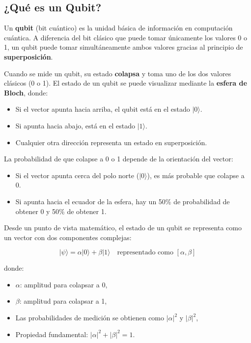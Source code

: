\documentclass{article}
\begin{document}
\subsection*{¿Qué es un Qubit?}

Un \textbf{qubit} (bit cuántico) es la unidad básica de información en computación cuántica. A diferencia del bit clásico que puede tomar únicamente los valores 0 o 1, un qubit puede tomar simultáneamente ambos valores gracias al principio de \textbf{superposición}.

Cuando se mide un qubit, su estado \textbf{colapsa} y toma uno de los dos valores clásicos (0 o 1). El estado de un qubit se puede visualizar mediante la \textbf{esfera de Bloch}, donde:

\begin{itemize}
    \item Si el vector apunta hacia arriba, el qubit está en el estado $\vert 0 \rangle$.
    \item Si apunta hacia abajo, está en el estado $\vert 1 \rangle$.
    \item Cualquier otra dirección representa un estado en superposición.
\end{itemize}

La probabilidad de que colapse a 0 o 1 depende de la orientación del vector:

\begin{itemize}
    \item Si el vector apunta cerca del polo norte ($\vert 0 \rangle$), es más probable que colapse a 0.
    \item Si apunta hacia el ecuador de la esfera, hay un 50\% de probabilidad de obtener 0 y 50\% de obtener 1.
\end{itemize}

Desde un punto de vista matemático, el estado de un qubit se representa como un vector con dos componentes complejas:

\[
|\psi\rangle = \alpha \vert 0 \rangle + \beta \vert 1 \rangle \quad \text{representado como } [\alpha, \beta]
\]

donde:
\begin{itemize}
    \item $\alpha$: amplitud para colapsar a 0,
    \item $\beta$: amplitud para colapsar a 1,
    \item Las probabilidades de medición se obtienen como $|\alpha|^2$ y $|\beta|^2$,
    \item Propiedad fundamental: $|\alpha|^2 + |\beta|^2 = 1$.
\end{itemize}
\end{document}
